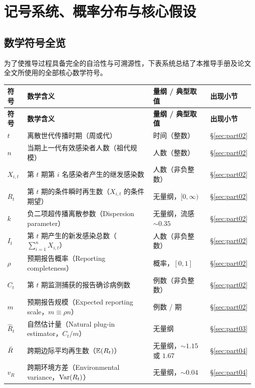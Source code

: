 \section{记号系统、概率分布与核心假设}
\label{sec:part01}

\subsection{数学符号全览}

为了使推导过程具备完全的自洽性与可溯源性，下表系统总结了本推导手册及论文全文所使用的全部核心数学符号。

\begin{center}
\small
\begin{longtable}{@{}llll@{}}
\toprule
\textbf{符号} & \textbf{数学含义} & \textbf{量纲 / 典型取值} & \textbf{出现小节} \\
\midrule
\endfirsthead
\toprule
\textbf{符号} & \textbf{数学含义} & \textbf{量纲 / 典型取值} & \textbf{出现小节} \\
\midrule
\endhead
\bottomrule
\endfoot
$t$ & 离散世代传播时期（周或代） & 时间（整数） & \S\ref{sec:part02} \\
$n$ & 当期上一代有效感染者人数（祖代规模） & 人数（整数） & \S\ref{sec:part02} \\
$X_{i,t}$ & 第 $t$ 期第 $i$ 名感染者产生的继发感染数 & 人数（非负整数） & \S\ref{sec:part02} \\
$R_t$ & 第 $t$ 期的条件瞬时再生数（$X_{i,t}$ 的条件期望） & 无量纲，$[0, \infty)$ & \S\ref{sec:part02} \\
$k$ & 负二项超传播离散参数（Dispersion parameter） & 无量纲，流感 $\sim 0.35$ & \S\ref{sec:part02} \\
$I_t$ & 第 $t$ 期产生的新发感染总数（$\sum_{i=1}^n X_{i,t}$） & 人数（非负整数） & \S\ref{sec:part02} \\
$\rho$ & 预期报告概率（Reporting completeness） & 概率，$[0, 1]$ & \S\ref{sec:part02} \\
$C_t$ & 第 $t$ 期监测捕获的报告确诊病例数 & 例数（非负整数） & \S\ref{sec:part02} \\
$m$ & 预期报告规模（Expected reporting scale，$m \equiv \rho n$） & 例数 / 期 & \S\ref{sec:part02} \\
$\widehat{R}_t$ & 自然估计量（Natural plug-in estimator，$C_t / m$） & 无量纲 & \S\ref{sec:part03} \\
$\bar{R}$ & 跨期边际平均再生数（$\mathbb{E}(R_t)$） & 无量纲，$\sim 1.15$ 或 $1.67$ & \S\ref{sec:part04} \\
$v_R$ & 跨期环境方差（Environmental variance，$\mathrm{Var}(R_t)$） & 无量纲，$\sim 0.04$ & \S\ref{sec:part04} \\

\end{longtable}
\end{center}
